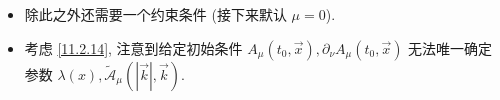 \begin{itemize}
\begin{itemize}
		\item 当 $\mu \neq 0$ 时,
		\begin{equation}
			\begin{dcases}
				\text{on shell:} & \vec{\tilde{A}} \ \text{取值任意} \\
				\text{off shell:} & \vec{k} \cdot \vec{\tilde{A}} = 0 \Longrightarrow \vec{\tilde{A}} = \tilde{A}_0 = 0
			\end{dcases} \Longrightarrow \tilde{A}_\mu(k) = \tilde{\mathcal{A}}_\mu(k) 2 \pi \delta(k^2 - \mu^2).
		\end{equation}
		其中 $\vec{\tilde{\mathcal{A}}}(k)$ 是任意函数, 且 $\mathrm{sign}(k^0) \omega_k \tilde{\mathcal{A}}_0 - \vec{k} \cdot \vec{\tilde{\mathcal{A}}} = 0$. 因此
		\begin{equation}
			A_\mu(x) = \int \frac{d^3 k}{(2 \pi)^3 2 \omega_k} \Big( \tilde{\mathcal{A}}_\mu(\omega_k, \vec{k}) e^{- i (\omega_k x^0 - \vec{k} \cdot \vec{x})} + \tilde{\mathcal{A}}^*_\mu(\omega_k, \vec{k}) e^{i (\omega_k x^0 - \vec{k} \cdot \vec{x})} \Big).
		\end{equation}
	\end{itemize}
	
	\begin{tcolorbox}[title=calculation:]
		对 \eqref{11.2.12} 两边同时内积 $\vec{k}$, 有
		\begin{equation}
			(k^2 - \mu^2) (\vec{k} \cdot \vec{\tilde{A}}) = 0 \quad \text{or} \quad \omega_k = |\vec{k}|,
		\end{equation}
		因此 $\mu = 0$ 时 \eqref{11.2.12} 自然成立, 而 massive 情况下 $\tilde{A}_0 = \vec{k} \cdot \vec{\tilde{A}} = 0$ 除非 on shell.
	\end{tcolorbox}
	
	\item 除此之外还需要一个约束条件 (接下来默认 $\mu = 0$).
	
	\item 考虑 \eqref{11.2.14}, 注意到给定初始条件 $A_\mu(t_0, \vec{x}), \partial_\nu A_\mu(t_0, \vec{x})$ 无法唯一确定参数 $\lambda(x), \tilde{\mathcal{A}}_\mu(|\vec{k}|, \vec{k})$.
	

\end{itemize}
